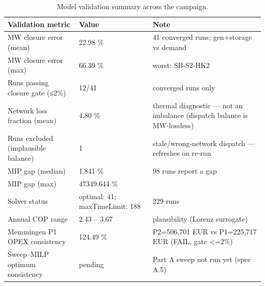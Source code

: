 \begin{table}[htbp]
  \centering
  \caption{Model validation summary across the campaign.}
  \label{tab:t5_validation}
  \begin{tabular}{lll}
  \toprule
  Validation metric & Value & Note \\
  \midrule
  MW closure error (mean) & 22.98 \% & 41 converged runs; gen+storage vs demand \\
  MW closure error (max) & 66.39 \% & worst: SB-S2-HK2 \\
  Runs passing closure gate (≤2\%) & 12/41 & converged runs only \\
  Network loss fraction (mean) & 4.80 \% & thermal diagnostic — not an imbalance (dispatch balance is MW-lossless) \\
  Runs excluded (implausible balance) & 1 & stale/wrong-network dispatch — refreshes on re-run \\
  MIP gap (median) & 1.841 \% & 98 runs report a gap \\
  MIP gap (max) & 47349.644 \% &  \\
  Solver status & optimal: 41; maxTimeLimit: 188 & 229 runs \\
  Annual COP range & 2.43 -- 3.67 & plausibility (Lorenz surrogate) \\
  Memmingen P1 OPEX consistency & 124.49 \% & P2=506,701 EUR vs P1=225,717 EUR (FAIL, gate <=2\%) \\
  Sweep--MILP optimum consistency & pending & Part A sweep not run yet (spec A.5) \\
  \bottomrule
  \end{tabular}
\end{table}
